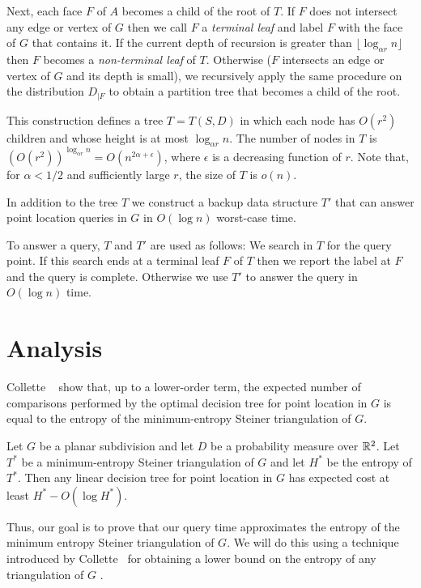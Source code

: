 \documentclass{patmorin}
\begin{document}
Next, each face $F$ of $A$ becomes a child of the root of $T$.  If $F$
does not intersect any edge or vertex of $G$ then we call $F$ a
\emph{terminal leaf} and label $F$ with the face of $G$ that contains it.
If the current depth of recursion is greater than $\lfloor\log_{\alpha r}
n\rfloor$ then $F$ becomes a \emph{non-terminal leaf} of $T$.  Otherwise
($F$ intersects an edge or vertex of $G$ and its depth is small),
we recursively apply the same procedure on the distribution $D_{|F}$
to obtain a partition tree that becomes a child of the root.

This construction defines a tree $T=T(S,D)$ in which each node has
$O(r^2)$ children and whose height is at most $\log_{\alpha r} n$.
The number of nodes in $T$ is $(O(r^2))^{\log_{\alpha r} n} =
O(n^{2\alpha+\epsilon})$, where $\epsilon$ is a decreasing function
of $r$.  Note that, for $\alpha < 1/2$ and sufficiently large $r$,
the size of $T$ is $o(n)$.

In addition to the tree $T$ we construct a backup data structure $T'$ that
can answer point location queries in $G$ in $O(\log n)$ worst-case time.

To answer a query, $T$ and $T'$ are used as follows:  We search in $T$
for the query point. If this search ends at a terminal leaf $F$ of $T$
then we report the label at $F$ and the query is complete.  Otherwise we
use $T'$ to answer the query in $O(\log n)$ time.

\section{Analysis}

Collette \etal\ \cite{cdilm08,cdilm09} show that, up to a lower-order
term, the expected number of comparisons performed by the optimal
decision tree for point location in $G$ is equal to the entropy of the
minimum-entropy Steiner triangulation of $G$.

\begin{thm}
Let $G$ be a planar subdivision and let $D$ be a probability measure
over $\mathbb{R}^2$.  Let $T^*$ be a  minimum-entropy Steiner triangulation of
$G$ and let $H^*$ be the entropy of $T^*$.  Then any linear decision tree
for point location in $G$ has expected cost at least $H^*-O(\log H^*)$.
\end{thm}

Thus, our goal is to prove that our query time approximates the entropy
of the minimum entropy Steiner triangulation of $G$.  We will do this
using a technique introduced by Collette \etal\ for obtaining a lower
bound on the entropy of any triangulation of $G$ \cite{dhMMX}.
\end{document}

